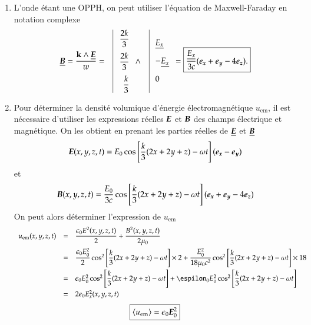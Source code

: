 \begin{corrige}
\begin{enumerate}
	\item L'onde étant une OPPH, on peut utiliser l'équation de Maxwell-Faraday
	      en notation complexe
	      \begin{equation*}
		      \complex{\vecb} = \dfrac{\vec{k} \wedge \complex{\vece}}{w} = \quad
		      \vline
		      \begin{array}{r}
			      \dfrac{2k}{3} \\[1em]
			      \dfrac{2k}{3} \\[1em]
			      \dfrac{k}{3}
		      \end{array}
		      \wedge \quad 
		      \vline
		      \begin{array}{l}
			      \complex{E_x} \\[1em]
			      -\complex{E_x} \\[1em]
			      0 
		      \end{array}
		      = \boxed{\dfrac{\complex{E_x}}{3c}(\ex + \ey - 4\ez).}
	     \end{equation*}
	\item Pour déterminer la densité volumique d'énergie électromagnétique
	      $u_\mathrm{em}$, il est nécessaire d'utiliser les expressions
	      réelles $\vece$ et $\vecb$ des champs électrique et magnétique. 
	      On les obtient en prenant les parties réelles de $\complex{\vece}$
	      et $\complex{\vecb}$
	      \begin{equation*}
		      \vece(x, y, z, t) = E_0 \cos\left[
		      \dfrac{k}{3}(2x + 2y +z) - \omega t \right](\ex - \ey)
	      \end{equation*}
	      et
	      \begin{equation*}
		      \vecb(x, y, z, t) = \dfrac{E_0}{3c} \cos\left[
		      \dfrac{k}{3}(2x + 2y +z) - \omega t \right](\ex + \ey - 4\ez)
	      \end{equation*}
	      On peut alors déterminer l'expression de $u_\mathrm{em}$
	      \begin{equation*}
		      \begin{array}{rcl}
			      u_\mathrm{em}(x, y, z, t) &=& 
			\dfrac{\epsilon_0 E^2(x, y, z, t)}{2} 
			+ \dfrac{B^2(x, y, z, t)}{2 \mu_0} \\[1em]
			   &=& \dfrac{\epsilon_0 E_0^2}{2} \cos^2\left[
		      \dfrac{k}{3}(2x + 2y +z) - \omega t \right] \times 2 +
		      \dfrac{E_0^2}{18 \mu_0 c^2} \cos^2\left[
		      \dfrac{k}{3}(2x + 2y +z) - \omega t \right] \times 18 \\[1em]
		      	  &=& \epsilon_0 E_0^2 \cos^2\left[
		      \dfrac{k}{3}(2x + 2y +z) - \omega t \right] +
		      \espilon_0 E_0 ^2 \cos^2\left[
		      \dfrac{k}{3}(2x + 2y +z) - \omega t \right]\\[1em]
			  &=& 2 \epsilon_0 E_x^2(x, y, z, t)
		      \end{array}
	      \end{equation*}
	      \begin{equation*}
		      \boxed{
		      \langle u_\mathrm{em} \rangle = \epsilon_0 \vece_0^2
	      }
      	     \end{equation*}


\end{enumerate}
\end{corrige}
